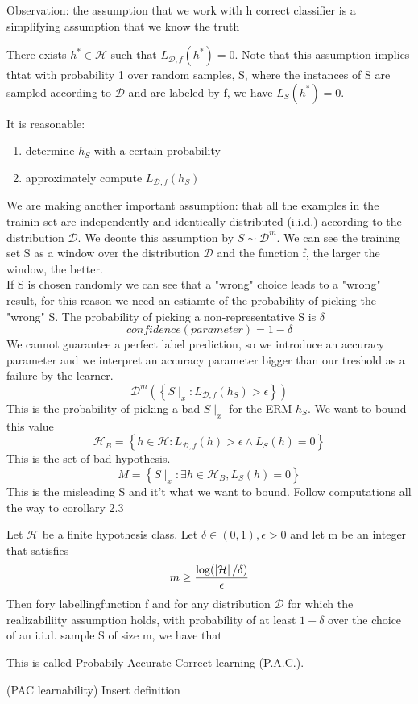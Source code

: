 Observation: the assumption that we work with h correct classifier is a simplifying assumption that we know the truth
\begin{definition}
    There exists $h^* \in \mathcal{H}$ such that $L_{\mathcal{D},f} (h^*) = 0$. Note that this assumption implies thtat with probability 1 over random samples, S, where the instances of S are sampled according to $\mathcal{D}$ and are labeled by f, we have $L_S(h^*) = 0$.
\end{definition}
It is reasonable:
\begin{enumerate}
    \item determine $h_S$ with a certain probability
    \item approximately compute $L_{\mathcal{D},f}(h_S)$
\end{enumerate}
We are making another important assumption: that all the examples in the trainin set are independently and identically distributed (i.i.d.) according to the distribution $\mathcal{D}$. We deonte this assumption by $S \sim \mathcal{D}^m$. We can see the training set S as a window over the distribution $\mathcal{D}$ and the function f, the larger the window, the better.\\
If S is chosen randomly we can see that a "wrong" choice leads to a "wrong" result, for this reason we need an estiamte of the probability of picking the "wrong" S. The probability of picking a non-representative S is $\delta$
\[ 
    confidence(parameter) = 1-\delta
\]We cannot guarantee a perfect label prediction, so we introduce an accuracy parameter and we interpret an accuracy parameter bigger than our treshold as a failure by the learner.
\[ 
    \mathcal{D}^m\left( \left\{ S\mid_x : L_{\mathcal{D},f}(h_S)>\epsilon \right\} \right) 
\]
This is the probability of picking a bad $S\mid_x$ for the ERM $h_S$. We want to bound this value
\[ 
    \mathcal{H}_B = \left\{ h \in \mathcal{H}: L_{\mathcal{D},f}(h)>\epsilon \wedge L_S(h)=0 \right\} 
\]This is the set of bad hypothesis.
\[ 
    M = \left\{ S\mid_x : \exists h \in \mathcal{H}_B, L_S(h)= 0 \right\}
\]This is the misleading S and it't what we want to bound. 
Follow computations all the way to corollary 2.3
\begin{corollary}
    Let $\mathcal{H}$ be a finite hypothesis class. Let $\delta \in (0,1), \epsilon >0$ and let m be an integer that satisfies
    \[ 
        m\geq \frac{\log(\left\lvert\mathcal{H}\right\rvert/\delta)}{\epsilon} 
    \]
    Then fory labellingfunction f and for any distribution $\mathcal{D}$ for which the realizabiliity assumption holds, with probability of at least $1-\delta$ over the choice of an i.i.d.  sample S of size m, we have that 
\end{corollary}
This is called Probabily Accurate Correct learning (P.A.C.).
\begin{definition}(PAC learnability)
    Insert definition
\end{definition}